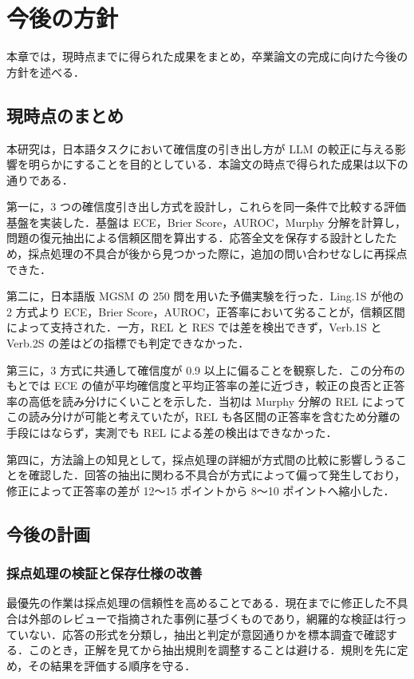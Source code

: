 \chapter{今後の方針}

本章では，現時点までに得られた成果をまとめ，卒業論文の完成に向けた今後の方針を述べる．

\section{現時点のまとめ}

本研究は，日本語タスクにおいて確信度の引き出し方が LLM の較正に与える影響を明らかにすることを目的としている．本論文の時点で得られた成果は以下の通りである．

第一に，3 つの確信度引き出し方式を設計し，これらを同一条件で比較する評価基盤を実装した．基盤は ECE，Brier Score，AUROC，Murphy 分解を計算し，問題の復元抽出による信頼区間を算出する．応答全文を保存する設計としたため，採点処理の不具合が後から見つかった際に，追加の問い合わせなしに再採点できた．

第二に，日本語版 MGSM の 250 問を用いた予備実験を行った．Ling.1S が他の2 方式より ECE，Brier Score，AUROC，正答率において劣ることが，信頼区間によって支持された．一方，REL と RES では差を検出できず，Verb.1S と Verb.2S の差はどの指標でも判定できなかった．

第三に，3 方式に共通して確信度が 0.9 以上に偏ることを観察した．この分布のもとでは ECE の値が平均確信度と平均正答率の差に近づき，較正の良否と正答率の高低を読み分けにくいことを示した．当初は Murphy 分解の REL によってこの読み分けが可能と考えていたが，REL も各区間の正答率を含むため分離の手段にはならず，実測でも REL による差の検出はできなかった．

第四に，方法論上の知見として，採点処理の詳細が方式間の比較に影響しうることを確認した．回答の抽出に関わる不具合が方式によって偏って発生しており，修正によって正答率の差が 12〜15 ポイントから 8〜10 ポイントへ縮小した．

\section{今後の計画}

\subsection{採点処理の検証と保存仕様の改善}

最優先の作業は採点処理の信頼性を高めることである．現在までに修正した不具合は外部のレビューで指摘された事例に基づくものであり，網羅的な検証は行っていない．応答の形式を分類し，抽出と判定が意図通りかを標本調査で確認する．このとき，正解を見てから抽出規則を調整することは避ける．規則を先に定め，その結果を評価する順序を守る．

